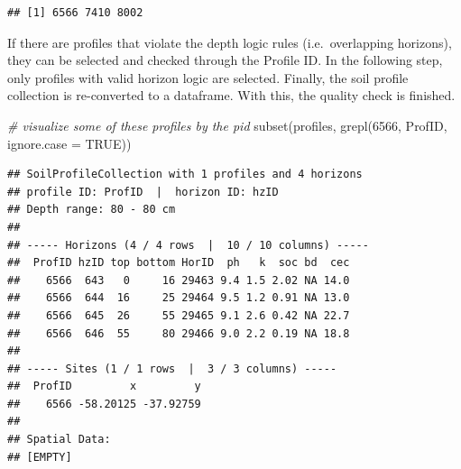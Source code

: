 \documentclass[
  10pt,
  b5paper,
  oneside]{book}
\newenvironment{Shaded}{\begin{snugshade}}{\end{snugshade}}
\newcommand{\AttributeTok}[1]{\textcolor[rgb]{0.77,0.63,0.00}{#1}}
\newcommand{\CommentTok}[1]{\textcolor[rgb]{0.56,0.35,0.01}{\textit{#1}}}
\newcommand{\ConstantTok}[1]{\textcolor[rgb]{0.00,0.00,0.00}{#1}}
\newcommand{\DecValTok}[1]{\textcolor[rgb]{0.00,0.00,0.81}{#1}}
\newcommand{\FunctionTok}[1]{\textcolor[rgb]{0.00,0.00,0.00}{#1}}
\newcommand{\NormalTok}[1]{#1}
\newcommand{\OtherTok}[1]{\textcolor[rgb]{0.56,0.35,0.01}{#1}}
\newcommand{\SpecialCharTok}[1]{\textcolor[rgb]{0.00,0.00,0.00}{#1}}
\newcommand{\StringTok}[1]{\textcolor[rgb]{0.31,0.60,0.02}{#1}}
\begin{document}
\begin{Shaded}
\end{Shaded}

\begin{verbatim}
## [1] 6566 7410 8002
\end{verbatim}

If there are profiles that violate the depth logic rules (i.e.~overlapping horizons), they can be selected and checked through the Profile ID. In the following step, only profiles with valid horizon logic are selected. Finally, the soil profile collection is re-converted to a dataframe. With this, the quality check is finished.

\begin{Shaded}
\begin{Highlighting}[]
\CommentTok{\# visualize some of these profiles by the pid}
\FunctionTok{subset}\NormalTok{(profiles, }\FunctionTok{grepl}\NormalTok{(}\DecValTok{6566}\NormalTok{, ProfID, }\AttributeTok{ignore.case =} \ConstantTok{TRUE}\NormalTok{))}
\end{Highlighting}
\end{Shaded}

\begin{verbatim}
## SoilProfileCollection with 1 profiles and 4 horizons
## profile ID: ProfID  |  horizon ID: hzID 
## Depth range: 80 - 80 cm
## 
## ----- Horizons (4 / 4 rows  |  10 / 10 columns) -----
##  ProfID hzID top bottom HorID  ph   k  soc bd  cec
##    6566  643   0     16 29463 9.4 1.5 2.02 NA 14.0
##    6566  644  16     25 29464 9.5 1.2 0.91 NA 13.0
##    6566  645  26     55 29465 9.1 2.6 0.42 NA 22.7
##    6566  646  55     80 29466 9.0 2.2 0.19 NA 18.8
## 
## ----- Sites (1 / 1 rows  |  3 / 3 columns) -----
##  ProfID         x         y
##    6566 -58.20125 -37.92759
## 
## Spatial Data:
## [EMPTY]
\end{verbatim}
\end{document}
